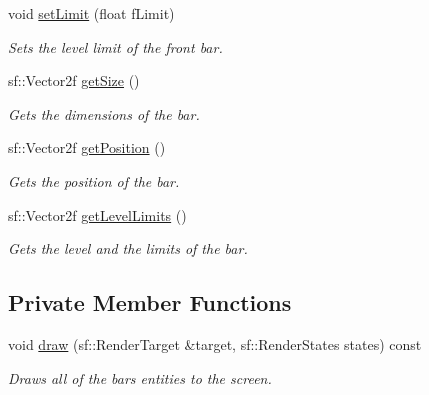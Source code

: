 \begin{DoxyCompactItemize}
void \hyperlink{class_bar_a9a39051c7f17e2bf8b9c4661e34c8560}{set\+Limit} (float f\+Limit)
\begin{DoxyCompactList}\small\item\em Sets the level limit of the front bar. \end{DoxyCompactList}\item 
sf\+::\+Vector2f \hyperlink{class_bar_a1d0a9f5d5951e0f5809aac6d723dfeae}{get\+Size} ()
\begin{DoxyCompactList}\small\item\em Gets the dimensions of the bar. \end{DoxyCompactList}\item 
sf\+::\+Vector2f \hyperlink{class_bar_a35368752d6d5871b485afc16eeb85c85}{get\+Position} ()
\begin{DoxyCompactList}\small\item\em Gets the position of the bar. \end{DoxyCompactList}\item 
sf\+::\+Vector2f \hyperlink{class_bar_a73b6e7901e22862c7283e64597670c72}{get\+Level\+Limits} ()
\begin{DoxyCompactList}\small\item\em Gets the level and the limits of the bar. \end{DoxyCompactList}\end{DoxyCompactItemize}
\subsection*{Private Member Functions}
\begin{DoxyCompactItemize}
\item 
void \hyperlink{class_bar_adcc40bc664443ae23e956423292cdabc}{draw} (sf\+::\+Render\+Target \&target, sf\+::\+Render\+States states) const
\begin{DoxyCompactList}\small\item\em Draws all of the bar\textquotesingle{}s entities to the screen. \end{DoxyCompactList}\end{DoxyCompactItemize}
